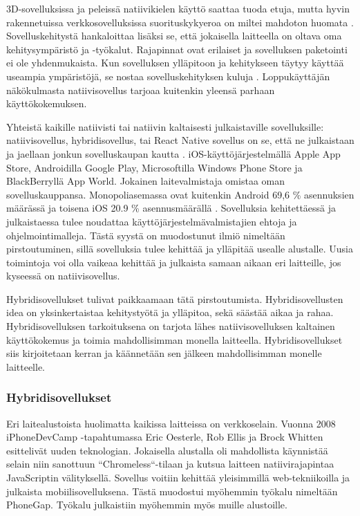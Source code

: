 \documentclass{tktltiki}
\begin{document}
3D-sovelluksissa ja peleissä natiivikielen käyttö saattaa tuoda etuja, mutta hyvin rakennetuissa verkkosovelluksissa suorituskykyeroa on miltei mahdoton huomata \cite{charland2011mobile}. Sovelluskehitystä hankaloittaa lisäksi se, että jokaisella laitteella on oltava oma kehitysympäristö ja -työkalut. Rajapinnat ovat erilaiset ja sovelluksen paketointi ei ole yhdenmukaista. Kun sovelluksen ylläpitoon ja kehitykseen täytyy käyttää useampia ympäristöjä, se nostaa sovelluskehityksen kuluja \cite{xanthopoulos2013comparative}. Loppukäyttäjän näkökulmasta natiivisovellus tarjoaa kuitenkin yleensä parhaan käyttökokemuksen.

Yhteistä kaikille natiivisti tai natiivin kaltaisesti julkaistaville sovelluksille: natiivisovellus, hybridisovellus, tai React Native sovellus on se, että ne julkaistaan ja jaellaan jonkun sovelluskaupan kautta \cite{xanthopoulos2013comparative}. iOS-käyttöjärjestelmällä Apple App Store, Androidilla Google Play, Microsoftilla Windows Phone Store ja BlackBerryllä App World. Jokainen laitevalmistaja omistaa oman sovelluskauppansa. Monopoliasemassa ovat kuitenkin Android 69,6 \% asennuksien määrässä ja toisena iOS 20.9 \% asennusmäärällä \cite{xanthopoulos2013comparative}. Sovelluksia kehitettäessä ja julkaistaessa tulee noudattaa käyttöjärjestelmävalmistajien ehtoja ja ohjelmointimalleja. Tästä syystä on muodostunut ilmiö nimeltään pirstoutuminen, sillä sovelluksia tulee kehittää ja ylläpitää usealle alustalle. Uusia toimintoja voi olla vaikeaa kehittää ja julkaista samaan aikaan eri laitteille, jos kyseessä on natiivisovellus.

Hybridisovellukset tulivat paikkaamaan tätä pirstoutumista. Hybridisovellusten idea on yksinkertaistaa kehitystyötä ja ylläpitoa, sekä säästää aikaa ja rahaa. Hybridisovelluksen tarkoituksena on tarjota lähes natiivisovelluksen kaltainen käyttökokemus ja toimia mahdollisimman monella laitteella. Hybridisovellukset siis kirjoitetaan kerran ja käännetään sen jälkeen mahdollisimman monelle laitteelle. 

\subsubsection{Hybridisovellukset}

Eri laitealustoista huolimatta kaikissa laitteissa on verkkoselain. Vuonna 2008 iPhoneDevCamp -tapahtumassa Eric Oesterle, Rob Ellis ja Brock Whitten \cite{charland2011mobile} esittelivät uuden teknologian. Jokaisella alustalla oli mahdollista käynnistää selain niin sanottuun “Chromeless“-tilaan ja kutsua laitteen natiivirajapintaa JavaScriptin välityksellä. Sovellus voitiin kehittää yleisimmillä web-tekniikoilla ja julkaista mobiilisovelluksena. Tästä muodostui myöhemmin työkalu nimeltään PhoneGap. Työkalu julkaistiin myöhemmin myös muille alustoille. 
\end{document}

